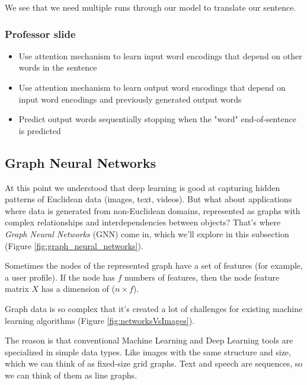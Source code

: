 We see that we need multiple runs through our model to translate our sentence.

\subsubsection{Professor slide}
\begin{itemize}
    \item Use attention mechanism to learn input word encodings that depend on other words in the sentence
    
    \item Use attention mechanism to learn output word encodings that depend on input word encodings and previously generated output words
    
    \item Predict output words sequentially stopping when the "word" end-of-sentence is predicted
\end{itemize}

\subsection{Graph Neural Networks}
At this point we understood that deep learning is good at capturing hidden patterns of Euclidean data (images, text, videos). But what about applications where data is generated from non-Euclidean domains, represented as graphs with complex relationships and interdependencies between objects? That’s where \textit{Graph Neural Networks} (GNN) come in, which we’ll explore in this subsection (Figure \ref{fig:graph_neural_networks}). \newline

Sometimes the nodes of the represented graph have a set of features (for example, a user profile). If the node has $f$ numbers of features, then the node feature matrix $X$ has a dimension of ($n \times f$). \newline

Graph data is so complex that it’s created a lot of challenges for existing machine learning algorithms (Figure \ref{fig:networksVsImages}). \newline

The reason is that conventional Machine Learning and Deep Learning tools are specialized in simple data types. Like images with the same structure and size, which we can think of as fixed-size grid graphs. Text and speech are sequences, so we can think of them as line graphs. \newline

